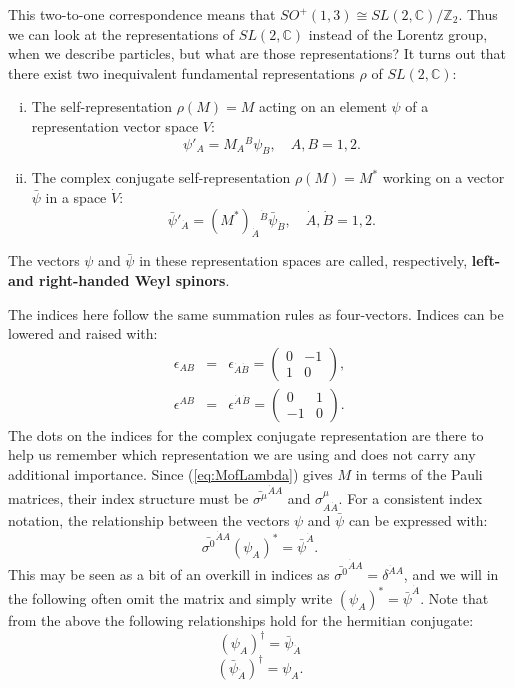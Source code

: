 \documentclass[notes.tex]{subfiles}
\begin{document}
This two-to-one correspondence means that $SO^+(1,3) \cong SL(2, \mathbb{C})/\mathbb{Z}_2$. Thus we can look at the representations of $SL(2, \mathbb{C})$ instead of the  Lorentz group, when we describe particles, but what are those representations? It turns out that there exist two inequivalent fundamental representations $\rho$ of $SL(2, \mathbb{C})$:
\begin{enumerate}[i)]
\item The self-representation $\rho(M) = M$ acting on an element $\psi$ of a representation vector space $V$:
\[\psi'_A = M_A{}^B\psi_B,  \quad A, B = 1,2.\]
\item The complex conjugate self-representation $\rho(M) = M^*$ working on a vector $\bar{\psi}$ in a space $\dot V$:
\[\bar{\psi}'_{\dot{A}} = (M^*)_{\dot{A}}{}^{\dot{B}}\bar{\psi}_{\dot{B}}, \quad  \dot{A}, \dot{B} = 1,2.\]
\end{enumerate}
The vectors $\psi$ and $\bar{\psi}$ in these representation spaces are called, respectively, {\bf left- and right-handed Weyl spinors}. 

The indices here follow the same summation rules as four-vectors. Indices can be lowered and raised with:
\begin{eqnarray}
\epsilon_{AB} &=& \epsilon_{\dot A \dot B} = \begin{pmatrix} 0 & -1\\ 1 & 0\end{pmatrix}, \label{eq:epsilonAB} \\
\epsilon^{AB} &=& \epsilon^{\dot{A}}{}^{\dot{B}} = \begin{pmatrix} 0 & 1\\ -1 & 0\end{pmatrix}.\label{eq:epsilonAdotBdot}
\end{eqnarray}
The dots on the indices for the complex conjugate representation are there to help us remember which representation we are using and does not carry any additional importance. 
Since (\ref{eq:MofLambda}) gives $M$ in terms of the Pauli matrices, their index structure must be $\bar{\sigma^\mu}^{\dot{A}A}$ and $\sigma^\mu_{A\dot{A}}$. 
For a consistent index notation, the relationship between the vectors $\psi$ and $\bar{\psi}$ can be expressed with:
\[\bar{\sigma^0}^{\dot{A}A}(\psi_A)^* = \bar{\psi}^{\dot{A}}.\]
This may be seen as a bit of an overkill in indices as $\bar{\sigma^0}^{\dot{A}A} = \delta^{\dot{A}A}$, and we will in the following often omit the matrix and simply write $(\psi_A)^* = \bar{\psi}^{\dot{A}}$.
Note that from the above the following relationships hold for the hermitian conjugate:
\[(\psi_A)^\dagger = \bar{\psi}_{\dot{A}}\]
\[(\bar{\psi}_{\dot{A}})^\dagger = \psi_A.\]
\end{document}
